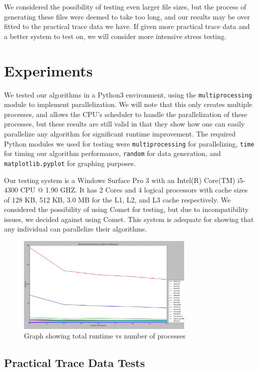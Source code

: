 \documentclass{acmtog} %
\begin{document}
	We considered the possibility of testing even larger file sizes, but the process of generating these files were deemed to take too long, and our results may be over fitted to the practical trace data we have. If given more practical trace data and a better system to test on, we will consider more intensive stress testing.
	
	
	\section{Experiments}
	We tested our algorithms in a Python3 environment, using the \texttt{multiprocessing} module to implement parallelization. We will note that this only creates multiple processes, and allows the CPU's scheduler to handle the parallelization of these processes, but these results are still valid in that they show how one can easily parallelize any algorithm for significant runtime improvement. The required Python modules we used for testing were \texttt{multiprocessing} for parallelizing, \texttt{time} for timing our algorithm performance, \texttt{random} for data generation, and \texttt{matplotlib.pyplot} for graphing purposes. 
	
	Our testing system is a Windows Surface Pro 3 with an Intel(R) Core(TM) i5-4300 CPU @ 1.90 GHZ. It has 2 Cores and 4 logical processors with cache sizes of 128 KB, 512 KB, 3.0 MB for the L1, L2, and L3 cache respectively. We considered the possibility of using Comet for testing, but due to incompatibility issues, we decided against using Comet. This system is adequate for showing that any individual can parallelize their algorithms. 

	
	
		\begin{figure}
			\centerline{\includegraphics[width=8.5cm]{img/AllTimesvsProcess}}
			\caption{Graph showing total runtime vs number of processes}
			\label{fig:runtimecomparisons}
		\end{figure}
	\subsection{Practical Trace Data Tests}
\end{document}
